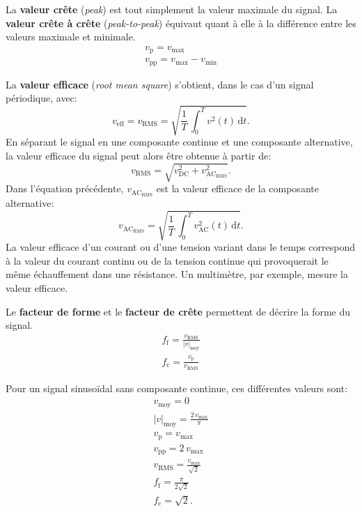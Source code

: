 \documentclass[12pt,oneside,letterpaper]{article}
\begin{document}
La \textbf{valeur crête} (\textit{peak}) est tout simplement la valeur maximale du signal. La \textbf{valeur crête à crête} (\textit{peak-to-peak}) équivaut quant à elle à la différence entre les valeurs maximale et minimale.
\begin{gather}
v_{\mathrm{p}}=v_{\mathrm{max}}\\
v_{\mathrm{pp}}=v_{\mathrm{max}}-v_{\mathrm{min}}
\end{gather}

La \textbf{valeur efficace} (\textit{root mean square}) s'obtient, dans le cas d'un signal périodique, avec:
\begin{equation}
v_{\mathrm{eff}}=v_{\mathrm{RMS}}=\sqrt{\frac{1}{T}\,\int_0^T v^2\!\left(t\right)\,\mathrm{d}t}.
\end{equation}
En séparant le signal en une composante continue et une composante alternative, la valeur efficace du signal peut alors être obtenue à partir de:
\begin{equation}
v_{\mathrm{RMS}}=\sqrt{v^2_{\mathrm{DC}}+v^2_{\mathrm{AC}_{\mathrm{RMS}}}}.
\end{equation}
Dans l'équation précédente, $v_{\mathrm{AC}_{\mathrm{RMS}}}$ est la valeur efficace de la composante alternative:
\begin{equation}
v_{\mathrm{AC}_{\mathrm{RMS}}}=\sqrt{\frac{1}{T}\,\int_0^T v^2_{\mathrm{AC}}\!\left(t\right)\,\mathrm{d}t}.
\end{equation}
La valeur efficace d'un courant ou d'une tension variant dans le temps correspond à la valeur du courant continu ou de la tension continue qui provoquerait le même échauffement dans une résistance. Un multimètre, par exemple, mesure la valeur efficace.

Le \textbf{facteur de forme} et le \textbf{facteur de crête} permettent de décrire la forme du signal.
\begin{gather}
f_{\mathrm{f}}=\frac{v_{\mathrm{RMS}}}{\left|v\right|_{\mathrm{moy}}}\\
f_{\mathrm{c}}=\frac{v_\mathrm{p}}{v_{\mathrm{RMS}}}
\end{gather}

Pour un signal sinusoïdal sans composante continue, ces différentes valeurs sont:
\begin{subequations}
\begin{gather}
v_{\mathrm{moy}}=0\\
\left|v\right|_{\mathrm{moy}}=\frac{2\,v_{\mathrm{max}}}{\pi}\\
v_{\mathrm{p}}=v_{\mathrm{max}}\\
v_{\mathrm{pp}}=2\,v_{\mathrm{max}}\\
v_{\mathrm{RMS}}=\frac{v_{\mathrm{max}}}{\sqrt{2}}\\
f_{\mathrm{f}}=\frac{\pi}{2\sqrt{2}}\\
f_{\mathrm{c}}=\sqrt{2}.
\end{gather}
\end{subequations}
\end{document}
